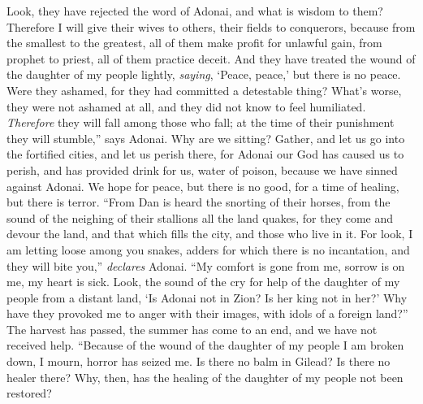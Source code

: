 \begin{biblechapter}
Look, they have rejected the word of Adonai, 
and what is wisdom to them?
\verse Therefore I will give their wives to others, 
their fields to conquerors, 
because from the smallest to the greatest, 
all of them make profit for unlawful gain, 
from prophet to priest, 
all of them practice deceit.
\verse And they have treated the wound of the daughter of my people lightly, 
\textit{saying}, ‘Peace, peace,’ but there is no peace.
\verse Were they ashamed, for they had committed a detestable thing? 
What’s worse, they were not ashamed at all, 
and they did not know to feel humiliated. 
\textit{Therefore} they will fall among those who fall; 
at the time of their punishment they will stumble,” says Adonai.
 Why are we sitting? 
Gather, and let us go into the fortified cities, 
and let us perish there, 
for Adonai our God has caused us to perish, 
and has provided drink for us, water of poison, 
because we have sinned against Adonai.
\verse We hope for peace, 
but there is no good, 
for a time of healing, 
but there is terror.
\verse “From Dan is heard the snorting of their horses, 
from the sound of the neighing of their stallions all the land quakes, 
for they come and devour the land, 
and that which fills the city, 
and those who live in it.
\verse For look, I am letting loose among you snakes, 
adders for which there is no incantation, 
and they will bite you,” \textit{declares} Adonai.
\verse “My comfort is gone from me, 
sorrow is on me, 
my heart is sick.
\verse Look, the sound of the cry for help of the daughter of my people 
from a distant land, 
‘Is Adonai not in Zion? 
Is her king not in her?’ 
Why have they provoked me to anger with their images, 
with idols of a foreign land?”
\verse The harvest has passed, 
the summer has come to an end, 
and we have not received help.
 “Because of the wound of the daughter of my people I am broken down, 
I mourn, horror has seized me.
\verse Is there no balm in Gilead? 
Is there no healer there? 
Why, then, has the healing of the daughter of my people not been restored?
\end{biblechapter}

